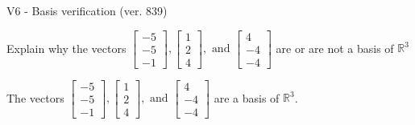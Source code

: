 \begin{exercise}
  \begin{exerciseTitle}V6 - Basis verification (ver. 839)\end{exerciseTitle}
  \begin{exerciseStatement}
    Explain why the vectors \(\left[\begin{array}{r}
-5 \\
-5 \\
-1
\end{array}\right] , \left[\begin{array}{r}
1 \\
2 \\
4
\end{array}\right] , \text{ and } \left[\begin{array}{r}
4 \\
-4 \\
-4
\end{array}\right]\) are or are not a basis of \(\mathbb{R}^3\)	


  \end{exerciseStatement}
  \begin{exerciseAnswer}
   The vectors \(\left[\begin{array}{r}
-5 \\
-5 \\
-1
\end{array}\right] , \left[\begin{array}{r}
1 \\
2 \\
4
\end{array}\right] , \text{ and } \left[\begin{array}{r}
4 \\
-4 \\
-4
\end{array}\right]\) 
  	 are  a basis of \(\mathbb{R}^3\).
  


  \end{exerciseAnswer}
\end{exercise}
